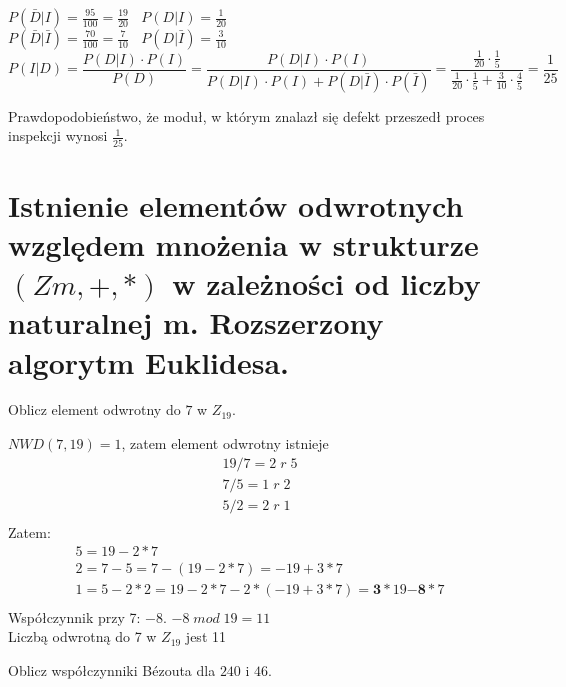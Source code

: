 \documentclass[main.tex]{subfiles}
\begin{document}
    $P(\bar{D}|I) = \frac{95}{100} = \frac{19}{20} ~ ~ ~ ~ P(D|I) = \frac{1}{20}$ \\

    $P(\bar{D}|\bar{I}) = \frac{70}{100} = \frac{7}{10} ~ ~ ~ ~ P(D|\bar{I}) = \frac{3}{10}$ \\

    \begin{equation*}
        P(I|D) = \frac{P(D|I)\cdot P(I)}{P(D)} = \frac{P(D|I)\cdot P(I)}{P(D|I)\cdot P(I) + P(D|\bar{I})\cdot P(\bar{I})} = \frac{\frac{1}{20}\cdot \frac{1}{5}}{\frac{1}{20}\cdot \frac{1}{5} + \frac{3}{10}\cdot \frac{4}{5}} = \frac{1}{25}
    \end{equation*}

    Prawdopodobieństwo, że moduł, w którym znalazł się defekt przeszedł proces inspekcji wynosi $\frac{1}{25}$.

    \newpage

    \section{Istnienie elementów odwrotnych względem mnożenia w strukturze $(Zm, +, *)$ w zależności od liczby naturalnej m. Rozszerzony algorytm Euklidesa.}
    \begin{exercise}
        Oblicz element odwrotny do $\mathrm{7}$ w $Z_{19}$.
    \end{exercise}

    $ NWD(7, 19) = 1 $, zatem element odwrotny istnieje
    \begin{gather*}
        19 / 7 = 2 \;r\; 5\\
        7 / 5 = 1 \;r\; 2\\
        5 / 2 = 2\; r\; 1\\
    \end{gather*}
    Zatem:
    \begin{gather*}
        5 = 19 - 2  * 7\\
        2 = 7 - 5 = 7 - (19 - 2 * 7) = -19 + 3 * 7\\
        1 = 5 - 2 * 2 = 19 - 2 * 7 - 2 * (-19 + 3 * 7) = \mathbf{3} * 19 \mathbf{- 8} * 7\\
    \end{gather*}
    Współczynnik przy 7: $-8$. $-8\; mod\; 19 = 11$\\
    Liczbą odwrotną do 7 w $Z_{19}$ jest 11
    \begin{exercise}
        Oblicz współczynniki Bézouta dla $\mathrm{240}$ i $\mathrm{46}$.
    \end{exercise}
\end{document}
